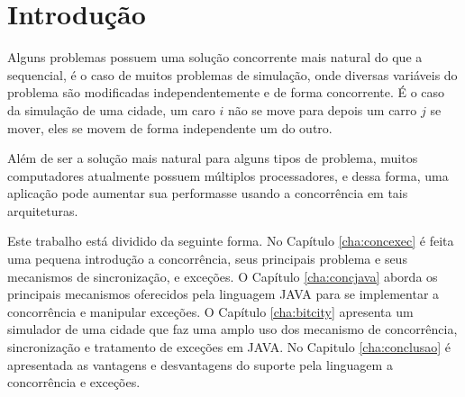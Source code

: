\chapter{Introdução}

Alguns problemas possuem uma solução concorrente mais natural do que a
sequencial, é o caso de muitos problemas de simulação, onde diversas
variáveis do problema são modificadas independentemente e de forma
concorrente. É o caso da simulação de uma cidade, um caro $i$ não se move
para depois um carro $j$ se mover, eles se movem de forma independente um
do outro.

Além de ser a solução mais natural para alguns tipos de problema, muitos
computadores atualmente possuem múltiplos processadores, e dessa forma, 
uma aplicação pode aumentar sua performasse usando a concorrência em tais
arquiteturas.



Este trabalho está dividido da seguinte forma. No Capítulo
\ref{cha:concexec} é feita uma pequena introdução a concorrência, seus
principais problema e seus mecanismos de sincronização, e exceções. O
Capítulo \ref{cha:concjava} aborda os principais mecanismos oferecidos pela
linguagem JAVA para se implementar a concorrência e manipular exceções. O
Capítulo \ref{cha:bitcity} apresenta um simulador de uma cidade que faz uma
amplo uso dos mecanismo de concorrência, sincronização e tratamento de
exceções em JAVA. No Capitulo \ref{cha:conclusao} é apresentada as
vantagens e desvantagens do suporte pela linguagem a concorrência e
exceções. 
